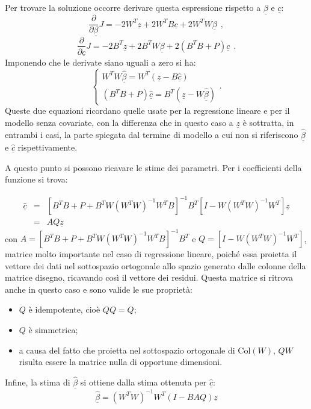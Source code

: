 \documentclass[a4paper,11pt,twoside,openright]{book}							%
\begin{document}
Per trovare la soluzione occorre derivare questa espressione rispetto a $\underline \beta$ e $\underline c$:
$$
\frac{\partial}{\partial \underline \beta}J= -2W^T \underline z + 2W^T B \underline c + 2 W^TW \underline \beta \ \ ,
$$
$$
\frac{\partial}{\partial \underline c}J= -2 B^T \underline z + 2 B^T W \underline \beta + 2(B^T B + P) \underline c \ \ .
$$
Imponendo che le derivate siano uguali a zero si ha:
$$
\begin{cases}
W^TW \hat{\underline \beta} = W^T(\underline z - B \hat{\underline c})  \\
(B^T B + P) \hat{\underline c}=B^T(\underline z -W \hat{\underline \beta})
\end{cases}.
$$
Queste due equazioni ricordano quelle usate per la regressione lineare e per il modello senza covariate, con la differenza che in questo caso a $\underline z$ è sottratta, in entrambi i casi, la parte spiegata dal termine di modello a cui non si riferiscono $\hat{\underline \beta}$ e $\hat{\underline c}$ rispettivamente.

A questo punto si possono ricavare le stime dei parametri. Per i coefficienti della funzione si trova:

\begin{eqnarray}
 \label{eq:syscovar1}
\hat  {\underline c} &=& [B^TB+P+B^TW(W^TW)^{-1}W^TB]^{-1}B^T[I-W(W^TW)^{-1}W^T]\underline z  \nonumber \\
 &=& AQ \underline z
\end{eqnarray} 
con $A=[B^TB+P+B^TW(W^TW)^{-1}W^TB]^{-1}B^T$ e $Q=[I-W(W^TW)^{-1}W^T]$, matrice molto importante nel caso di regressione lineare, poiché essa proietta il vettore dei dati nel sottospazio ortogonale allo spazio generato dalle colonne della matrice disegno, ricavando così il vettore dei residui. Questa matrice si ritrova anche in questo caso e sono valide le sue proprietà:
\begin{itemize}
\item $Q$ è idempotente, cioè $QQ=Q$;
\item $Q$ è simmetrica;
\item a causa del fatto che proietta nel sottospazio ortogonale di $\mathrm{Col}(W)$, $QW$ risulta essere la matrice nulla di opportune dimensioni. 
\end{itemize}
Infine, la stima di $\hat  {\underline \beta}$ si ottiene dalla stima ottenuta per $\hat  {\underline c}$:
\begin{equation}
\label{eq:syscovar2}
\hat{\underline{\beta}}=(W^TW)^{-1}W^T(I-B AQ)\underline z
\end{equation}
\end{document}
